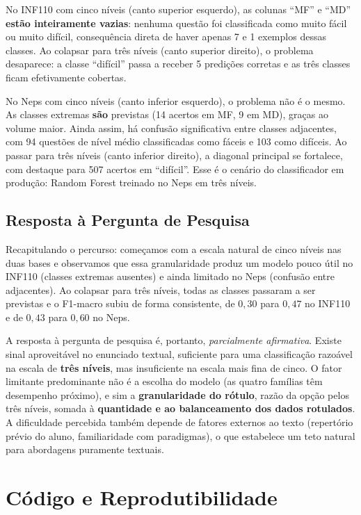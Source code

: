\documentclass[sigconf]{webmedia}
\begin{document}
No INF110 com cinco níveis (canto superior esquerdo), as colunas ``MF'' e ``MD'' \textbf{estão inteiramente vazias}: nenhuma questão foi classificada como muito fácil ou muito difícil, consequência direta de haver apenas 7 e 1 exemplos dessas classes. Ao colapsar para três níveis (canto superior direito), o problema desaparece: a classe ``difícil'' passa a receber 5 predições corretas e as três classes ficam efetivamente cobertas.

No Neps com cinco níveis (canto inferior esquerdo), o problema não é o mesmo. As classes extremas \textbf{são} previstas (14 acertos em MF, 9 em MD), graças ao volume maior. Ainda assim, há confusão significativa entre classes adjacentes, com 94 questões de nível médio classificadas como fáceis e 103 como difíceis. Ao passar para três níveis (canto inferior direito), a diagonal principal se fortalece, com destaque para 507 acertos em ``difícil''. Esse é o cenário do classificador em produção: Random Forest treinado no Neps em três níveis.

\subsection{Resposta à Pergunta de Pesquisa}
\label{sec:pergunta}

Recapitulando o percurso: começamos com a escala natural de cinco níveis nas duas bases e observamos que essa granularidade produz um modelo pouco útil no INF110 (classes extremas ausentes) e ainda limitado no Neps (confusão entre adjacentes). Ao colapsar para três níveis, todas as classes passaram a ser previstas e o F1-macro subiu de forma consistente, de $0{,}30$ para $0{,}47$ no INF110 e de $0{,}43$ para $0{,}60$ no Neps.

A resposta à pergunta de pesquisa é, portanto, \emph{parcialmente afirmativa}. Existe sinal aproveitável no enunciado textual, suficiente para uma classificação razoável na escala de \textbf{três níveis}, mas insuficiente na escala mais fina de cinco. O fator limitante predominante não é a escolha do modelo (as quatro famílias têm desempenho próximo), e sim a \textbf{granularidade do rótulo}, razão da opção pelos três níveis, somada à \textbf{quantidade e ao balanceamento dos dados rotulados}. A dificuldade percebida também depende de fatores externos ao texto (repertório prévio do aluno, familiaridade com paradigmas), o que estabelece um teto natural para abordagens puramente textuais.

\section{Código e Reprodutibilidade}
\label{sec:codigo}
\end{document}
